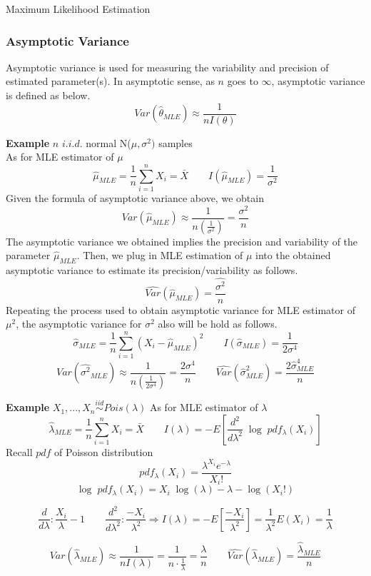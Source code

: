 \documentclass[12pt]{article}
\begin{document}
\begin{section}{Maximum Likelihood Estimation}
\subsubsection{Asymptotic Variance}
Asymptotic variance is used for measuring the variability and precision of estimated parameter(s). In asymptotic sense, as $n$ goes to $\infty$, asymptotic variance is defined as below.
$$Var(\hat{\theta}_{MLE}) \approx \frac{1}{nI(\theta)}$$

\textbf{Example} \quad $n$ $i.i.d.$ normal N($\mu,\sigma^2)$ samples\\

As for MLE estimator of $\mu$
$$\hat{\mu}_{MLE} = \frac{1}{n}\sum_{i=1}^n X_i = \bar{X} \qquad I(\hat{\mu}_{MLE}) = \frac{1}{\sigma^2}$$
Given the formula of asymptotic variance above, we obtain
$$Var(\hat{\mu}_{MLE}) \approx \frac{1}{n(\frac{1}{\sigma^2})} = \frac{\sigma^2}{n}$$ 
The asymptotic variance we obtained implies the precision and variability of the parameter $\hat{\mu}_{MLE}$. Then, we plug in MLE estimation of $\mu$ into the obtained asymptotic variance to estimate its precision/variability as follows.
$$\widehat{Var}(\hat{\mu}_{MLE}) = \frac{\hat{\sigma^2}}{n}$$
Repeating the process used to obtain asymptotic variance for MLE estimator of $\mu^2$, the asymptotic variance for $\sigma^2$ also will be hold as follows.
$$\hat{\sigma}_{MLE} = \frac{1}{n} \sum_{i=1}^n (X_i-\hat{\mu}_{MLE})^2 \qquad
I(\hat{\sigma}_{MLE}) = \frac{1}{2\sigma^4}$$
$$Var(\hat{\sigma^2}_{MLE}) \approx \frac{1}{n(\frac{1}{2\sigma^4})} = \frac{2\sigma^4}{n} \qquad \widehat{Var}(\hat{\sigma}^2_{MLE}) = \frac{2\hat{\sigma}^4_{MLE}}{n}$$

\textbf{Example} \quad $X_1, ... , X_n \stackrel{iid}{\sim} Pois(\lambda)$
As for MLE estimator of $\lambda$
$$\hat{\lambda}_{MLE} = \frac{1}{n}\sum_{i=1}^n X_i = \bar{X} \qquad I(\lambda) = -E\left[\frac{d^2}{d\lambda^2}\;\log\;pdf_\lambda (X_i)\right]$$
Recall $pdf$ of Poisson distribution
$$pdf_\lambda(X_i) = \frac{\lambda^{X_i}e^{-\lambda}}{X_i!}$$
$$\log \; pdf_\lambda (X_i) = X_i\;\log(\lambda) -\lambda - \log(X_i!)$$

$$\frac{d}{d\lambda}: \frac{X_i}{\lambda} - 1 \qquad \frac{d^2}{d\lambda^2}: \frac{-X_i}{\lambda^2} \Rightarrow I(\lambda) = -E\left[\frac{-X_i}{\lambda^2}\right] = \frac{1}{\lambda^2}E(X_i) = \frac{1}{\lambda}$$

$$Var(\hat{\lambda}_{MLE}) \approx \frac{1}{nI(\lambda)} = \frac{1}{n\cdot\frac{1}{\lambda}} = \frac{\lambda}{n} \qquad \widehat{Var}(\hat{\lambda}_{MLE}) = \frac{\hat{\lambda}_{MLE}}{n}$$


\end{section}
\end{document}
